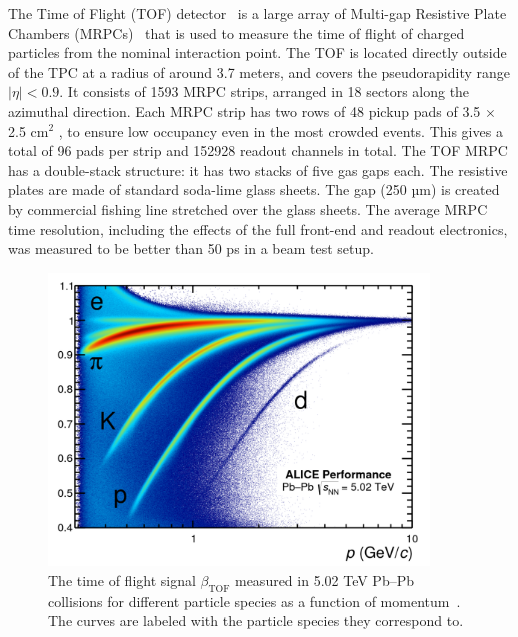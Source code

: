 The Time of Flight (TOF) detector~\cite{TOF1} is a large array of Multi-gap Resistive Plate Chambers (MRPCs)~\cite{TOF2} that is used to measure the time of flight of charged particles from the nominal interaction point. The TOF is located directly outside of the TPC at a radius of around 3.7 meters, and covers the pseudorapidity range $|\eta| < 0.9$. It consists of 1593 MRPC strips, arranged in 18 sectors along the azimuthal direction. Each MRPC strip has two rows of 48 pickup pads of 3.5 $\times$ 2.5 cm$^2$ , to ensure low occupancy even in the most crowded events. This gives a total of 96 pads per strip and 152928 readout channels in total. The TOF MRPC has a double-stack structure: it has two stacks of five gas gaps each. The resistive plates are made of standard soda-lime glass sheets. The gap (250 µm) is created by commercial fishing line stretched over the glass sheets. The average MRPC time resolution, including the effects of the full front-end and readout electronics, was measured to be better than 50 ps in a beam test setup.

\begin{figure}
    \centering
    \includegraphics[width=0.9\textwidth]{figures/experiment/tof_pid_curves.png}
    \caption{The time of flight signal $\beta_{\text{TOF}}$ measured in 5.02 TeV Pb--Pb collisions for different particle species as a function of momentum~\cite{TOFPIDPlot}. The curves are labeled with the particle species they correspond to.}
    \label{fig:tof_pid_curves}
\end{figure}

